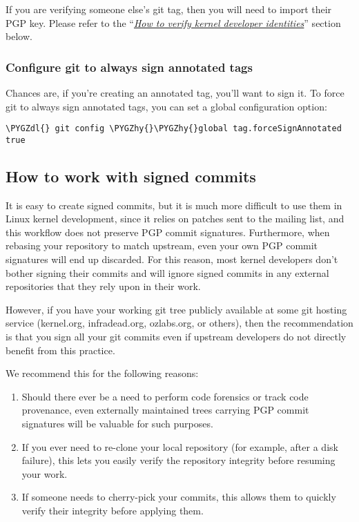 \documentclass[a4paper,8pt,english]{sphinxmanual}
\def\PYGZdl{\char`\$}
\def\PYGZhy{\char`\-}
\begin{document}
If you are verifying someone else's git tag, then you will need to
import their PGP key. Please refer to the
``{\hyperref[process/maintainer\string-pgp\string-guide:verify\string-identities]{\emph{How to verify kernel developer identities}}}'' section below.


\subsubsection{Configure git to always sign annotated tags}
\label{process/maintainer-pgp-guide:configure-git-to-always-sign-annotated-tags}
Chances are, if you're creating an annotated tag, you'll want to sign
it. To force git to always sign annotated tags, you can set a global
configuration option:

\begin{Verbatim}[commandchars=\\\{\}]
\PYGZdl{} git config \PYGZhy{}\PYGZhy{}global tag.forceSignAnnotated true
\end{Verbatim}


\subsection{How to work with signed commits}
\label{process/maintainer-pgp-guide:how-to-work-with-signed-commits}
It is easy to create signed commits, but it is much more difficult to
use them in Linux kernel development, since it relies on patches sent to
the mailing list, and this workflow does not preserve PGP commit
signatures. Furthermore, when rebasing your repository to match
upstream, even your own PGP commit signatures will end up discarded. For
this reason, most kernel developers don't bother signing their commits
and will ignore signed commits in any external repositories that they
rely upon in their work.

However, if you have your working git tree publicly available at some
git hosting service (kernel.org, infradead.org, ozlabs.org, or others),
then the recommendation is that you sign all your git commits even if
upstream developers do not directly benefit from this practice.

We recommend this for the following reasons:
\begin{enumerate}
\item {} 
Should there ever be a need to perform code forensics or track code
provenance, even externally maintained trees carrying PGP commit
signatures will be valuable for such purposes.

\item {} 
If you ever need to re-clone your local repository (for example,
after a disk failure), this lets you easily verify the repository
integrity before resuming your work.

\item {} 
If someone needs to cherry-pick your commits, this allows them to
quickly verify their integrity before applying them.

\end{enumerate}
\end{document}
